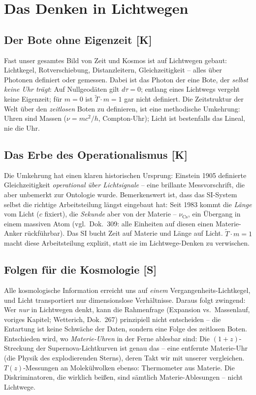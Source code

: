 \documentclass[11pt]{report}
\begin{document}
\chapter{Das Denken in Lichtwegen}

\section{Der Bote ohne Eigenzeit [K]}

Fast unser gesamtes Bild von Zeit und Kosmos ist auf Lichtwegen
gebaut: Lichtkegel, Rotverschiebung, Distanzleitern,
Gleichzeitigkeit -- alles über Photonen definiert oder gemessen.
Dabei ist das Photon der eine Bote, der \emph{selbst keine Uhr
trägt}: Auf Nullgeodäten gilt $d\tau = 0$; entlang eines Lichtwegs
vergeht keine Eigenzeit; für $m = 0$ ist $\tilde T \cdot m = 1$
gar nicht definiert. Die Zeitstruktur der Welt über den
\emph{zeitlosen} Boten zu definieren, ist eine methodische
Umkehrung: Uhren sind Massen ($\nu = mc^2/h$, Compton-Uhr); Licht
ist bestenfalls das Lineal, nie die Uhr.

\section{Das Erbe des Operationalismus [K]}

Die Umkehrung hat einen klaren historischen Ursprung: Einstein 1905
definierte Gleichzeitigkeit \emph{operational über
Lichtsignale} -- eine brillante Messvorschrift, die aber
unbemerkt zur Ontologie wurde. Bemerkenswert ist, dass das
SI-System selbst die richtige Arbeitsteilung längst eingebaut hat:
Seit 1983 kommt die \emph{Länge} vom Licht ($c$ fixiert), die
\emph{Sekunde} aber von der Materie -- $\nu_\text{Cs}$, ein
Übergang in einem massiven Atom (vgl.\ Dok.~309: alle Einheiten
auf diesen einen Materie-Anker rückführbar). Das SI bucht Zeit auf
Materie und Länge auf Licht. $\tilde T \cdot m = 1$ macht diese
Arbeitsteilung explizit, statt sie im Lichtwege-Denken zu
verwischen.

\section{Folgen für die Kosmologie [S]}

Alle kosmologische Information erreicht uns auf \emph{einem}
Vergangenheits-Lichtkegel, und Licht transportiert nur
dimensionslose Verhältnisse. Daraus folgt zwingend: Wer
\emph{nur} in Lichtwegen denkt, kann die Rahmenfrage (Expansion
vs.\ Massenlauf, voriges Kapitel; Wetterich, Dok.~267) prinzipiell
nicht entscheiden -- die Entartung ist keine Schwäche der Daten,
sondern eine Folge des zeitlosen Boten. Entschieden wird, wo
\emph{Materie-Uhren} in der Ferne ablesbar sind: Die
$(1+z)$-Streckung der Supernova-Lichtkurven ist genau das -- eine
entfernte Materie-Uhr (die Physik des explodierenden Sterns), deren
Takt wir mit unserer vergleichen. $T(z)$-Messungen an
Molekülwolken ebenso: Thermometer aus Materie. Die
Diskriminatoren, die wirklich beißen, sind sämtlich
Materie-Ablesungen -- nicht Lichtwege.
\end{document}
